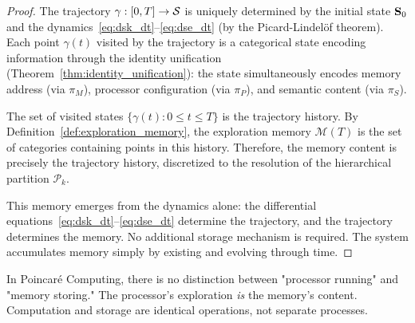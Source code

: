 \begin{proof}
The trajectory $\gamma: [0, T] \to \mathcal{S}$ is uniquely determined by the initial state $\mathbf{S}_0$ and the dynamics~\eqref{eq:dsk_dt}--\eqref{eq:dse_dt} (by the Picard-Lindelöf theorem). Each point $\gamma(t)$ visited by the trajectory is a categorical state encoding information through the identity unification (Theorem~\ref{thm:identity_unification}): the state simultaneously encodes memory address (via $\pi_M$), processor configuration (via $\pi_P$), and semantic content (via $\pi_S$).

The set of visited states $\{\gamma(t) : 0 \leq t \leq T\}$ is the trajectory history. By Definition~\ref{def:exploration_memory}, the exploration memory $\mathcal{M}(T)$ is the set of categories containing points in this history. Therefore, the memory content is precisely the trajectory history, discretized to the resolution of the hierarchical partition $\mathcal{P}_k$.

This memory emerges from the dynamics alone: the differential equations~\eqref{eq:dsk_dt}--\eqref{eq:dse_dt} determine the trajectory, and the trajectory determines the memory. No additional storage mechanism is required. The system accumulates memory simply by existing and evolving through time.
\end{proof}

\begin{corollary}
\label{cor:no_separation}
In Poincaré Computing, there is no distinction between "processor running" and "memory storing." The processor's exploration \textit{is} the memory's content. Computation and storage are identical operations, not separate processes.
\end{corollary}

